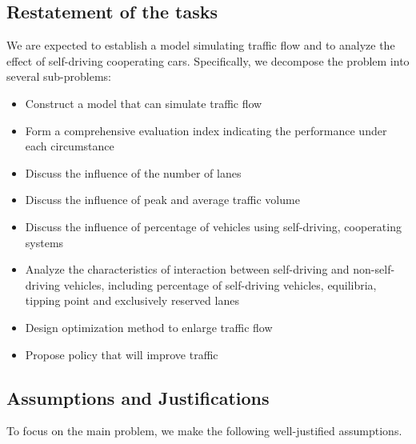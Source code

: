 \documentclass[a4paper]{article}
\begin{document}
	\subsection{Restatement of the tasks}
	We are expected to establish a model simulating traffic flow and to analyze the effect of self-driving cooperating cars. Specifically, we decompose the problem into several sub-problems:
	\begin{itemize}
		\item Construct a model that can simulate traffic flow
		\item Form a comprehensive evaluation index indicating the performance under each circumstance
		\item Discuss the influence of the number of lanes
		\item Discuss the influence of peak and average traffic volume
		\item Discuss the influence of percentage of vehicles using self-driving, cooperating systems
		\item Analyze the characteristics of interaction between self-driving and non-self-driving vehicles, including percentage of self-driving vehicles, equilibria, tipping point and exclusively reserved lanes
		\item Design optimization method to enlarge traffic flow
		\item Propose policy that will improve traffic 
	\end{itemize}
	
	\subsection{Assumptions and Justifications}
	To focus on the main problem, we make the following well-justified assumptions.
	
\end{document}
